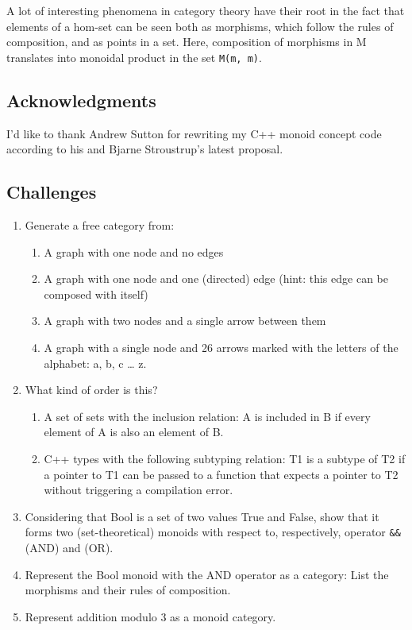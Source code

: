 A lot of interesting phenomena in category theory have their root in the
fact that elements of a hom-set can be seen both as morphisms, which
follow the rules of composition, and as points in a set. Here,
composition of morphisms in M translates into monoidal product in the
set \texttt{M(m, m)}.

\subsection{Acknowledgments}\label{acknowledgments}

I'd like to thank Andrew Sutton for rewriting my C++ monoid concept code
according to his and Bjarne Stroustrup's latest proposal.

\subsection{Challenges}\label{challenges}

\begin{enumerate}
\item
  Generate a free category from:

  \begin{enumerate}
  \item
    A graph with one node and no edges
  \item
    A graph with one node and one (directed) edge (hint: this edge can
    be composed with itself)
  \item
    A graph with two nodes and a single arrow between them
  \item
    A graph with a single node and 26 arrows marked with the letters of
    the alphabet: a, b, c \ldots{} z.
  \end{enumerate}
\item
  What kind of order is this?

  \begin{enumerate}
  \item
    A set of sets with the inclusion relation: A is included in B if
    every element of A is also an element of B.
  \item
    C++ types with the following subtyping relation: T1 is a subtype of
    T2 if a pointer to T1 can be passed to a function that expects a
    pointer to T2 without triggering a compilation error.
  \end{enumerate}
\item
  Considering that Bool is a set of two values True and False, show that
  it forms two (set-theoretical) monoids with respect to, respectively,
  operator \texttt{\&\&} (AND) and \texttt{\textbar{}\textbar{}} (OR).
\item
  Represent the Bool monoid with the AND operator as a category: List
  the morphisms and their rules of composition.
\item
  Represent addition modulo 3 as a monoid category.
\end{enumerate}